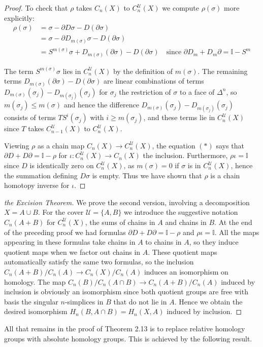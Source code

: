 \begin{proof}
To check that $\rho$ takes $C_n(X)$ to $C_n^{\mathcal{U}}(X)$ we compute $\rho(\sigma)$ more explicitly:
\begin{align*}
\rho(\sigma) &= \sigma - \partial D\sigma - D(\partial\sigma)\\
&= \sigma - \partial D_{m(\sigma)}\sigma - D(\partial\sigma)\\
&= S^{m(\sigma)}\sigma + D_{m(\sigma)}(\partial\sigma) - D(\partial\sigma) \quad \text{since } \partial D_m + D_m\partial = \mathbb{I} - S^m
\end{align*}

The term $S^{m(\sigma)}\sigma$ lies in $C_n^{\mathcal{U}}(X)$ by the definition of $m(\sigma)$. The remaining terms $D_{m(\sigma)}(\partial\sigma) - D(\partial\sigma)$ are linear combinations of terms $D_{m(\sigma)}(\sigma_j) - D_{m(\sigma_j)}(\sigma_j)$ for $\sigma_j$ the restriction of $\sigma$ to a face of $\Delta^n$, so $m(\sigma_j) \leq m(\sigma)$ and hence the difference $D_{m(\sigma)}(\sigma_j) - D_{m(\sigma_j)}(\sigma_j)$ consists of terms $TS^i(\sigma_j)$ with $i \geq m(\sigma_j)$, and these terms lie in $C_n^{\mathcal{U}}(X)$ since $T$ takes $C_{n-1}^{\mathcal{U}}(X)$ to $C_n^{\mathcal{U}}(X)$.

Viewing $\rho$ as a chain map $C_n(X)\to C_n^{\mathcal{U}}(X)$, the equation $(*)$ says that $\partial D + D\partial = \mathbb{I} - \rho$ for $\iota:C_n^{\mathcal{U}}(X)\to C_n(X)$ the inclusion. Furthermore, $\rho\iota = \mathbb{I}$ since $D$ is identically zero on $C_n^{\mathcal{U}}(X)$, as $m(\sigma) = 0$ if $\sigma$ is in $C_n^{\mathcal{U}}(X)$, hence the summation defining $D\sigma$ is empty. Thus we have shown that $\rho$ is a chain homotopy inverse for $\iota$.
\end{proof}
\begin{proof}[the Excision Theorem]
 We prove the second version, involving a decomposition $X = A \cup B$. For the cover $\mathcal{U} = \{A, B\}$ we introduce the suggestive notation $C_n(A + B)$ for $C_n^{\mathcal{U}}(X)$, the sums of chains in $A$ and chains in $B$. At the end of the preceding proof we had formulas $\partial D + D\partial = \mathbb{I} - \rho$ and $\rho\iota = \mathbb{I}$. All the maps appearing in these formulas take chains in $A$ to chains in $A$, so they induce quotient maps when we factor out chains in $A$. These quotient maps automatically satisfy the same two formulas, so the inclusion $C_n(A + B)/C_n(A) \to C_n(X)/C_n(A)$ induces an isomorphism on homology. The map $C_n(B)/C_n(A \cap B)\to C_n(A + B)/C_n(A)$ induced by inclusion is obviously an isomorphism since both quotient groups are free with basis the singular $n$-simplices in $B$ that do not lie in $A$. Hence we obtain the desired isomorphism $H_n(B, A \cap B) = H_n(X, A)$ induced by inclusion.
\end{proof}
All that remains in the proof of Theorem 2.13 is to replace relative homology groups with absolute homology groups. This is achieved by the following result.

